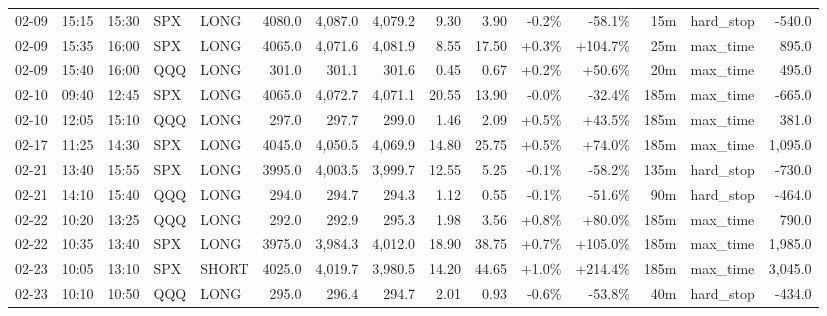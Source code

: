 \documentclass[11pt,a4paper,twoside]{article}
\begin{document}
\begin{landscape}
\begin{center}
\begin{longtable}{>{\color{txtmain}}l l l l l r r r r r r r r >{\color{txtmain}}l r}
02-09 & 15:15 & 15:30 & SPX & LONG & 4080.0 & 4,087.0 & 4,079.2 & 9.30 & 3.90 & \textcolor{lossred}{-0.2\%} & \textcolor{lossred}{-58.1\%} & 15m & hard\_stop & \textcolor{lossred}{-540.0} \\
02-09 & 15:35 & 16:00 & SPX & LONG & 4065.0 & 4,071.6 & 4,081.9 & 8.55 & 17.50 & \textcolor{wingreen}{+0.3\%} & \textcolor{wingreen}{+104.7\%} & 25m & max\_time & \textcolor{wingreen}{895.0} \\
02-09 & 15:40 & 16:00 & QQQ & LONG & 301.0 & 301.1 & 301.6 & 0.45 & 0.67 & \textcolor{wingreen}{+0.2\%} & \textcolor{wingreen}{+50.6\%} & 20m & max\_time & \textcolor{wingreen}{495.0} \\
02-10 & 09:40 & 12:45 & SPX & LONG & 4065.0 & 4,072.7 & 4,071.1 & 20.55 & 13.90 & \textcolor{lossred}{-0.0\%} & \textcolor{lossred}{-32.4\%} & 185m & max\_time & \textcolor{lossred}{-665.0} \\
02-10 & 12:05 & 15:10 & QQQ & LONG & 297.0 & 297.7 & 299.0 & 1.46 & 2.09 & \textcolor{wingreen}{+0.5\%} & \textcolor{wingreen}{+43.5\%} & 185m & max\_time & \textcolor{wingreen}{381.0} \\
02-17 & 11:25 & 14:30 & SPX & LONG & 4045.0 & 4,050.5 & 4,069.9 & 14.80 & 25.75 & \textcolor{wingreen}{+0.5\%} & \textcolor{wingreen}{+74.0\%} & 185m & max\_time & \textcolor{wingreen}{1,095.0} \\
02-21 & 13:40 & 15:55 & SPX & LONG & 3995.0 & 4,003.5 & 3,999.7 & 12.55 & 5.25 & \textcolor{lossred}{-0.1\%} & \textcolor{lossred}{-58.2\%} & 135m & hard\_stop & \textcolor{lossred}{-730.0} \\
02-21 & 14:10 & 15:40 & QQQ & LONG & 294.0 & 294.7 & 294.3 & 1.12 & 0.55 & \textcolor{lossred}{-0.1\%} & \textcolor{lossred}{-51.6\%} & 90m & hard\_stop & \textcolor{lossred}{-464.0} \\
02-22 & 10:20 & 13:25 & QQQ & LONG & 292.0 & 292.9 & 295.3 & 1.98 & 3.56 & \textcolor{wingreen}{+0.8\%} & \textcolor{wingreen}{+80.0\%} & 185m & max\_time & \textcolor{wingreen}{790.0} \\
02-22 & 10:35 & 13:40 & SPX & LONG & 3975.0 & 3,984.3 & 4,012.0 & 18.90 & 38.75 & \textcolor{wingreen}{+0.7\%} & \textcolor{wingreen}{+105.0\%} & 185m & max\_time & \textcolor{wingreen}{1,985.0} \\
02-23 & 10:05 & 13:10 & SPX & SHORT & 4025.0 & 4,019.7 & 3,980.5 & 14.20 & 44.65 & \textcolor{wingreen}{+1.0\%} & \textcolor{wingreen}{+214.4\%} & 185m & max\_time & \textcolor{wingreen}{3,045.0} \\
02-23 & 10:10 & 10:50 & QQQ & LONG & 295.0 & 296.4 & 294.7 & 2.01 & 0.93 & \textcolor{lossred}{-0.6\%} & \textcolor{lossred}{-53.8\%} & 40m & hard\_stop & \textcolor{lossred}{-434.0} \\

\end{longtable}
\end{center}
\end{landscape}
\end{document}
